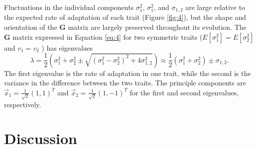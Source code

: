\documentclass[9pt,twocolumn,twoside]{gsajnl}
\newcommand{\G}{\textbf{G }}
\begin{document}
Fluctuations in the individual components $\sigma_1^2$, $\sigma_1^2$, and $\sigma_{1,2}$ are large relative to the expected rate of adaptation of each trait (Figure \ref{fig:4}), but the shape and orientation of the \G matrix are largely preserved throughout its evolution. The \G matrix expressed in Equation \ref{eq:4} for two symmetric traits ($E[\sigma_1^2] = E[ \sigma_2^2]$ and $v_1 = v_2 $ ) has eigenvalues
\[ \lambda = \frac{1}{2}\left( \sigma_1^2+ \sigma_2^2 \pm \sqrt{ (\sigma_1^2 -\sigma_2^2)^2 +4 \sigma_{1,2}^2 }\right) \approx \frac{1}{2}\left(\sigma_1^2+ \sigma_2^2\right) \pm  \sigma_{1,2}.  \]
The first eigenvalue is the rate of adaptation in one trait, while the second is the variance in the difference between the two traits. The principle components are $\vec{x}_1 = \frac{1}{\sqrt{2}}(1,1)^T$ and $\vec{x}_2 =\frac{1}{\sqrt{2}}(1,-1)^T$ for the first and second eigenvalues, respectively.  

\section*{Discussion}
\end{document}
